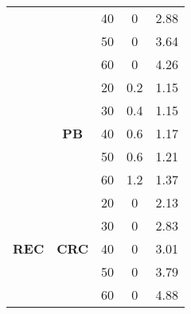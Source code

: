 \documentclass{article}
\begin{document}
\begin{table}[h!]
\begin{tabular}{|c|c|c|c|c|}
                               &                               & 40                     & 0                      & 2.88                              \\ \cline{3-5} 
                               &                               & 50                     & 0                      & 3.64                              \\ \cline{3-5} 
                               &                               & 60                     & 0                      & 4.26                              \\ \cline{2-5} 
                               & \multirow{5}{*}{\textbf{PB}}  & 20                     & 0.2                    & 1.15                              \\ \cline{3-5} 
                               &                               & 30                     & 0.4                    & 1.15                              \\ \cline{3-5} 
                               &                               & 40                     & 0.6                    & 1.17                              \\ \cline{3-5} 
                               &                               & 50                     & 0.6                    & 1.21                              \\ \cline{3-5} 
                               &                               & 60                     & 1.2                    & 1.37                              \\ \hline
\multirow{15}{*}{\textbf{REC}} & \multirow{5}{*}{\textbf{CRC}} & 20                     & 0                      & 2.13                              \\ \cline{3-5} 
                               &                               & 30                     & 0                      & 2.83                              \\ \cline{3-5} 
                               &                               & 40                     & 0                      & 3.01                              \\ \cline{3-5} 
                               &                               & 50                     & 0                      & 3.79                              \\ \cline{3-5} 
                               &                               & 60                     & 0                      & 4.88                              \\ \cline{2-5} 

\end{tabular}
\end{table}
\end{document}
